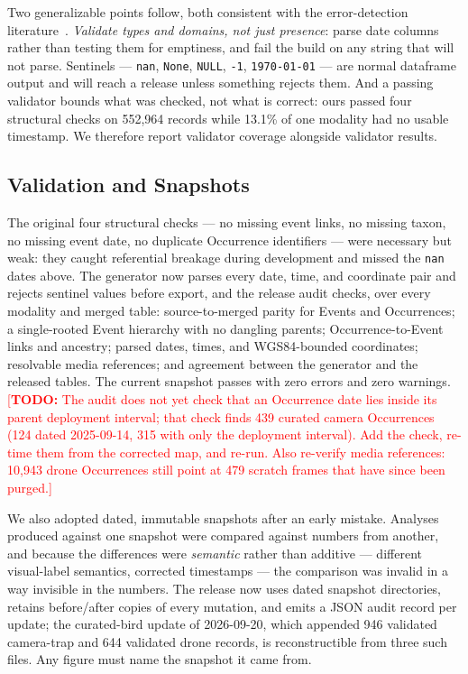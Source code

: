 \documentclass[sigconf]{acmart}
\newcommand{\TODO}[1]{\textcolor{red}{\footnotesize[\textbf{TODO:} #1]}}
\newcommand{\TODO}[1]{}
\begin{document}
Two generalizable points follow, both consistent with the
error-detection literature~\cite{abedjan2016detecting,schelter2018deequ}.
\emph{Validate types and domains, not just presence}: parse date columns rather than testing them for
emptiness, and fail the build on any string that will not parse.
Sentinels --- \texttt{nan}, \texttt{None}, \texttt{NULL}, \texttt{-1},
\texttt{1970-01-01} --- are normal dataframe output and will reach a
release unless something rejects them. And a passing validator bounds
what was checked, not what is correct: ours passed four structural checks
on 552{,}964 records while 13.1\% of one modality had no usable
timestamp. We therefore report validator coverage alongside validator
results.

\subsection{Validation and Snapshots}

The original four structural checks --- no missing event links, no
missing taxon, no missing event date, no duplicate Occurrence
identifiers --- were necessary but weak: they caught referential
breakage during development and missed the \texttt{nan} dates above.
The generator now parses every date, time, and coordinate pair and
rejects sentinel values before export, and the release audit checks,
over every modality and merged table: source-to-merged parity for Events
and Occurrences; a single-rooted Event hierarchy with no dangling
parents; Occurrence-to-Event links and ancestry; parsed dates, times,
and WGS84-bounded coordinates; resolvable media references; and
agreement between the generator and the released tables. The current
snapshot passes with zero errors and zero warnings.
\TODO{The audit does not yet check that an Occurrence date lies inside
its parent deployment interval; that check finds 439 curated camera
Occurrences (124 dated 2025-09-14, 315 with only the deployment
interval). Add the check, re-time them from the corrected map, and
re-run. Also re-verify media references: 10{,}943 drone Occurrences
still point at 479 scratch frames that have since been purged.}

We also adopted dated, immutable snapshots after an early mistake.
Analyses produced against one snapshot were compared against numbers
from another, and because the differences were \emph{semantic} rather
than additive --- different visual-label semantics, corrected timestamps
--- the comparison was invalid in a way invisible in the numbers. The
release now uses dated snapshot directories, retains before/after copies
of every mutation, and emits a JSON audit record per update; the
curated-bird update of 2026-09-20, which appended 946 validated
camera-trap and 644 validated drone records, is reconstructible from
three such files. Any figure must name the snapshot it came from.
\end{document}
